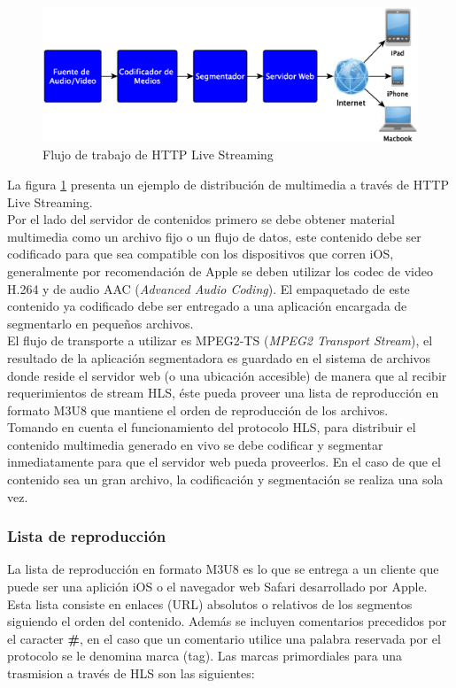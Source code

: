 \begin{figure}[H]
	\centering
	\includegraphics[scale=0.5]{imgs/HLS_diagram_wwdc2010.eps}
	\caption{Flujo de trabajo de HTTP Live Streaming}	
	\label{diagramaHLSwwdc2010}
\end{figure}		
		La figura \ref{diagramaHLSwwdc2010} presenta un ejemplo de distribución de multimedia a través de HTTP Live Streaming.\\
		
Por el lado del servidor de contenidos primero se debe obtener material multimedia como un archivo fijo o un flujo de datos, este contenido debe ser codificado para que sea compatible con los dispositivos que corren iOS, generalmente por recomendación de Apple se deben utilizar los codec de video H.264 y de audio AAC (\textit{Advanced Audio Coding}). El empaquetado de este contenido ya codificado debe ser entregado a una aplicación encargada de segmentarlo en pequeños archivos. \\

	El flujo de transporte a utilizar es MPEG2-TS (\textit{MPEG2 Transport Stream}), el resultado de la aplicación segmentadora es guardado en el sistema de archivos donde reside el servidor web (o una ubicación accesible) de manera que al recibir requerimientos de stream HLS, éste pueda proveer una lista de reproducción en formato M3U8 que mantiene el orden de reproducción de los archivos.\\
	
Tomando en cuenta el funcionamiento del protocolo HLS, para distribuir el contenido multimedia generado en vivo se debe codificar y segmentar inmediatamente para que el servidor web pueda proveerlos. En el caso de que el contenido sea un gran archivo, la codificación y segmentación se realiza una sola vez.

\subsubsection{Lista de reproducción}
\label{TAG-SECTION}
La lista de reproducción en formato M3U8 es lo que se entrega a un cliente que puede ser una aplición iOS o el navegador web Safari desarrollado por Apple. Esta lista consiste en enlaces (URL) absolutos o relativos de los segmentos siguiendo el orden del contenido. Además se incluyen comentarios precedidos por el caracter \textbf{\#}, en el caso que un comentario utilice una palabra reservada por el protocolo se le denomina marca (tag).
Las marcas primordiales para una trasmision a través de HLS son las siguientes:


